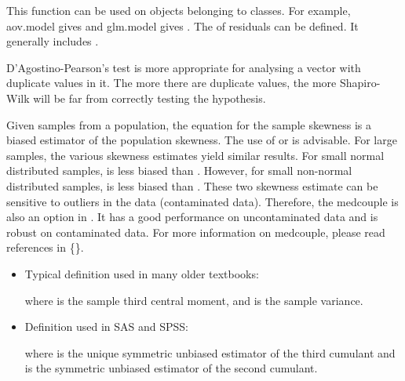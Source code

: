 \documentclass[a4paper]{book}
\begin{document}
%
\begin{Details}\relax
This function can be used on objects belonging to  classes. 
For example, aov.model\code{)} gives  and glm.model\code{)} 
gives . The  of residuals can be defined. It generally includes 
.

D'Agostino-Pearson's test is more appropriate for analysing a vector with
duplicate values in it. The more there are duplicate values, the more
Shapiro-Wilk will be far from correctly testing the  hypothesis.

Given samples from a population, the equation for the sample skewness 
is a biased estimator of the population skewness. The use of  or  is advisable.
For large samples, the various skewness estimates yield similar results. For small
normal distributed samples,  is less biased than .
However, for small non-normal distributed samples,  is less biased than .
These two skewness estimate can be sensitive to outliers in the data (contaminated data).
Therefore, the medcouple  is also an option in . It has a good
performance on uncontaminated data and is robust on contaminated data.
For more information on medcouple, please read references in \{\}.

\begin{itemize}

\item Typical definition used in many older textbooks:


where  is the sample third central moment, and  is the sample variance.\\{}

\end{itemize}


\begin{itemize}

\item Definition used in SAS and SPSS:


where  is the unique symmetric unbiased estimator of the third 
cumulant and  is the symmetric unbiased estimator of the second cumulant.\\{}


\end{itemize}
\end{Details}
\end{document}

